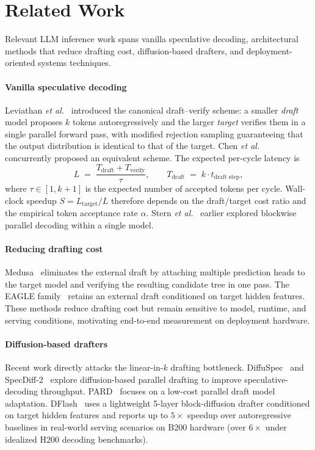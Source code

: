 \section{Related Work}
\label{sec:related}

Relevant LLM inference work spans vanilla speculative decoding,
architectural methods that reduce drafting cost, diffusion-based drafters,
and deployment-oriented systems techniques.

\paragraph{Vanilla speculative decoding}
Leviathan \emph{et al.}~\cite{Leviathan2023} introduced the canonical
draft--verify scheme: a smaller \emph{draft} model proposes $k$ tokens
autoregressively and the larger \emph{target} verifies them in a single
parallel forward pass, with modified rejection sampling guaranteeing that the
output distribution is identical to that of the target. Chen
\emph{et al.}~\cite{Chen2023specsampling} concurrently proposed an equivalent
scheme. The expected per-cycle latency is
\begin{equation}
  L \;=\; \frac{T_{\text{draft}} + T_{\text{verify}}}{\tau},
  \qquad
  T_{\text{draft}} \;=\; k \cdot t_{\text{draft step}},
  \label{eq:specdec-latency}
\end{equation}
where $\tau \in [1, k{+}1]$ is the expected number of accepted tokens per
cycle. Wall-clock speedup $S = L_{\text{target}}/L$ therefore depends on the
draft/target cost ratio and the empirical token acceptance rate $\alpha$.
Stern \emph{et al.}~\cite{Stern2018blockwise} earlier explored blockwise
parallel decoding within a single model.

\paragraph{Reducing drafting cost}
Medusa~\cite{Cai2024Medusa} eliminates the external draft by attaching
multiple prediction heads to the target model and verifying the resulting
candidate tree in one pass. The EAGLE
family~\cite{Li2024Eagle,Li2024Eagle2,Li2025Eagle3} retains an external draft
conditioned on target hidden features. These methods reduce drafting cost but
remain sensitive to model, runtime, and serving conditions, motivating
end-to-end measurement on deployment hardware.

\paragraph{Diffusion-based drafters}
Recent work directly attacks the linear-in-$k$ drafting bottleneck.
DiffuSpec~\cite{Li2025DiffuSpec} and SpecDiff-2~\cite{Sandler2025SpecDiff2}
explore diffusion-based parallel drafting to improve speculative-decoding
throughput. PARD~\cite{An2025PARD} focuses on a low-cost parallel draft model
adaptation. DFlash~\cite{Chen2026dflash} uses a lightweight 5-layer
block-diffusion drafter conditioned on target hidden features and reports up
to $5\times$ speedup over autoregressive baselines in real-world serving
scenarios on B200 hardware (over $6\times$ under idealized H200 decoding
benchmarks).

